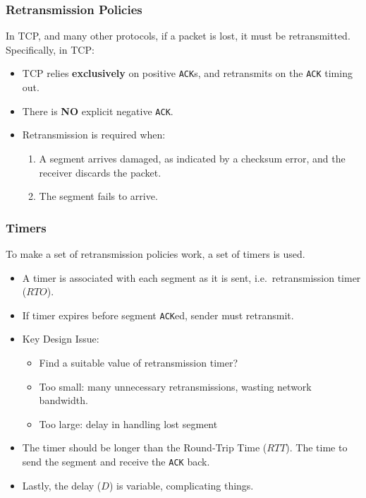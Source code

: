 \subsubsection{Retransmission Policies}\label{subsubsec:Retransmission_Policies}
In TCP, and many other protocols, if a packet is lost, it must be retransmitted.
Specifically, in TCP:\@
\begin{itemize}[noitemsep]
\item TCP relies \textbf{exclusively} on positive \texttt{ACK}s, and retransmits on the \texttt{ACK} timing out.
\item There is \textbf{NO} explicit negative \texttt{ACK}.
\item Retransmission is required when:
  \begin{enumerate}[noitemsep]
  \item A segment arrives damaged, as indicated by a checksum error, and the receiver discards the packet.
  \item The segment fails to arrive.
  \end{enumerate}
\end{itemize}

\subsubsection{Timers}\label{subsubsec:Packet_Timers}
To make a set of retransmission policies work, a set of timers is used.
\begin{itemize}[noitemsep]
\item A timer is associated with each segment as it is sent, i.e.\ retransmission timer ($RTO$).
\item If timer expires before segment \texttt{ACK}ed, sender must retransmit.
\item Key Design Issue:
  \begin{itemize}[noitemsep]
  \item Find a suitable value of retransmission timer?
  \item Too small: many unnecessary retransmissions, wasting network bandwidth.
  \item Too large: delay in handling lost segment
  \end{itemize}
\item The timer should be longer than the Round-Trip Time ($RTT$).
  The time to send the segment and receive the \texttt{ACK} back.
\item Lastly, the delay ($D$) is variable, complicating things.
\end{itemize}

